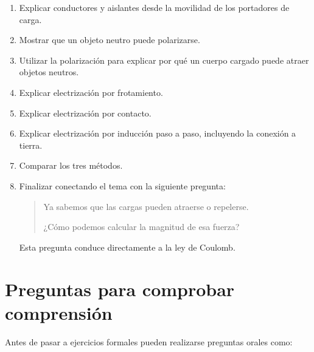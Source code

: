 \begin{notapedagogica}
\begin{enumerate}
    \item Explicar conductores y aislantes desde la movilidad de los
    portadores de carga.

    \item Mostrar que un objeto neutro puede polarizarse.

    \item Utilizar la polarización para explicar por qué un cuerpo cargado
    puede atraer objetos neutros.

    \item Explicar electrización por frotamiento.

    \item Explicar electrización por contacto.

    \item Explicar electrización por inducción paso a paso, incluyendo la
    conexión a tierra.

    \item Comparar los tres métodos.

    \item Finalizar conectando el tema con la siguiente pregunta:

    \begin{quote}
    Ya sabemos que las cargas pueden atraerse o repelerse.

    ¿Cómo podemos calcular la magnitud de esa fuerza?
    \end{quote}

    Esta pregunta conduce directamente a la ley de Coulomb.

\end{enumerate}
\end{notapedagogica}



\section{Preguntas para comprobar comprensión}

Antes de pasar a ejercicios formales pueden realizarse preguntas orales como:

